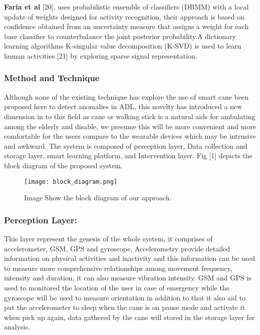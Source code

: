 \documentclass[a4paper, parskip=full]{scrartcl}
\begin{document}
\textbf{Faria et al} [20], uses probabilistic ensemble of classifiers (DBMM) with a local update of weights designed for activity recognition, their approach is based on confidence obtained from an uncertainty measure that assigns a weight for each base classifier to counterbalance the joint posterior probability.A dictionary learning algorithms K-singular value decomposition (K-SVD) is used to learn human activities [21] by exploring sparse signal representation.


\subsubsection*{Method and Technique}

Although none of the existing technique has explore the use of smart cane been proposed here to detect anomalies in ADL, this novelty has introduced a new dimension in to this field as cane or walking stick is a natural aids for ambulating among the elderly and disable, we presume this will be more convenient and more comfortable for the users compare to the wearable devices which may be intrusive and awkward. The system is composed of perception layer, Data collection and storage layer, smart learning platform, and Intervention layer. Fig [1] depicts the block diagram of the proposed system.

\begin{figure}
	\centering
	\texttt{[image: block\_diagram.png]}
	
	\caption{Image Show the block diagram of our approach.}
	
\end{figure}

\subsubsection*{Perception Layer:}

This layer represent the genesis of the whole system, it comprises of accelerometer, GSM, GPS and gyroscope, Accelerometry provide detailed information on physical activities and inactivity and this information can be used to measure more comprehensive relationships among movement frequency, intensity and duration, it can also measure vibration intensity. GSM and GPS is used to monitored the location of the user in case of emergency while the gyroscope will be used to measure orientation in addition to that it also aid to put the accelerometer to sleep when the cane is on pause mode and activate it when pick up again, data gathered by the cane will stored in the storage layer for analysis.
\end{document}

